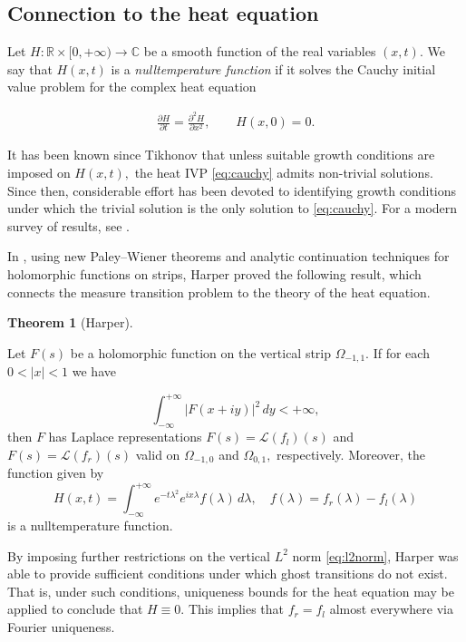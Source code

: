 \documentclass[12pt]{article}
\theoremstyle{definition}
\newtheorem{theorem}{Theorem}[section]
\begin{document}
\subsection{Connection to the heat equation}

Let \( H: \mathbb{R} \times [0, + \infty) \longrightarrow \mathbb{C}\) be a smooth function of the real variables $(x,t).$ We say that $H(x,t)$ is a \emph{nulltemperature function} if it solves the Cauchy initial value problem for the complex heat equation

\begin{align}\label{eq:cauchy}
\frac{\partial H}{\partial t} = \frac{\partial^2H}{\partial x^2}, \qquad H(x,0)=0. \end{align} 

It has been known since Tikhonov \cite{Tikhonov} that unless suitable growth conditions are imposed on $H(x,t),$ the heat IVP \eqref{eq:cauchy} admits non-trivial solutions. Since then,  considerable effort has been devoted to identifying growth conditions under which the trivial solution is the only solution to \eqref{eq:cauchy}. For a modern survey of results, see \cite{Ferretti}.

In \cite{Harper}, using new Paley--Wiener theorems and analytic continuation techniques for holomorphic functions on strips, Harper proved the following result, which connects the measure transition problem to the theory of the heat equation.

\begin{theorem}[Harper]\label{thm:Harper}

Let \(F(s)\) be a holomorphic function on the vertical strip \(\Omega_{-1,1}.\) If for each $0<|x|<1$ we have 

\begin{equation}\label{eq:l2norm}
    \int_{-\infty}^{+ \infty} |F(x+iy)|^2 \,dy < + \infty,
\end{equation} then $F$ has Laplace representations $F(s)= \mathcal{L}(f_l)(s)$ and $F(s)= \mathcal{L}(f_r)(s)$ valid on $\Omega_{-1,0}$ and $\Omega_{0,1},$ respectively. Moreover, the function given by \begin{equation}\label{eq:fundacalor} H(x,t)=\int_{-\infty}^{+ \infty} e^{-t \lambda^2}e^{ix \lambda}f(\lambda) \,d\lambda, \quad f(\lambda)=f_r(\lambda)-f_l(\lambda) \end{equation} is a nulltemperature function.
    
\end{theorem}

By imposing further restrictions on the vertical $L^2$ norm \eqref{eq:l2norm}, Harper was able to provide sufficient conditions under which ghost transitions do not exist. That is, under such conditions, uniqueness bounds for the heat equation may be applied to conclude that $H \equiv 0.$ This implies that $f_r=f_l$ almost everywhere via Fourier uniqueness.
\end{document}
